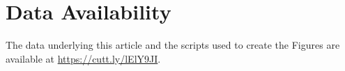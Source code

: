 \documentclass[fleqn,usenatbib]{mnras}
\begin{document}
\section*{Data Availability}
The data underlying this article and the scripts used to create the Figures are available at \href{https://cutt.ly/lElY9JI}{https://cutt.ly/lElY9JI}.









\appendix




\bsp	%
\label{lastpage}
\end{document}
